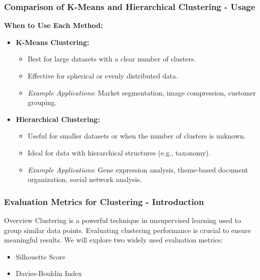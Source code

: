 \documentclass[aspectratio=169]{beamer}
\begin{document}
\begin{frame}[fragile]
    \frametitle{Comparison of K-Means and Hierarchical Clustering - Usage}

    \textbf{When to Use Each Method:}

    \begin{itemize}
        \item \textbf{K-Means Clustering:}
            \begin{itemize}
                \item Best for large datasets with a clear number of clusters.
                \item Effective for spherical or evenly distributed data.
                \item \textit{Example Applications}: Market segmentation, image compression, customer grouping.
            \end{itemize}
        
        \item \textbf{Hierarchical Clustering:}
            \begin{itemize}
                \item Useful for smaller datasets or when the number of clusters is unknown.
                \item Ideal for data with hierarchical structures (e.g., taxonomy).
                \item \textit{Example Applications}: Gene expression analysis, theme-based document organization, social network analysis.
            \end{itemize}
    \end{itemize}
\end{frame}

\begin{frame}[fragile]
    \frametitle{Evaluation Metrics for Clustering - Introduction}
    \begin{block}{Overview}
        Clustering is a powerful technique in unsupervised learning used to group similar data points. Evaluating clustering performance is crucial to ensure meaningful results. We will explore two widely used evaluation metrics:
        \begin{itemize}
            \item Silhouette Score
            \item Davies-Bouldin Index
        \end{itemize}
    \end{block}
\end{frame}
\end{document}
